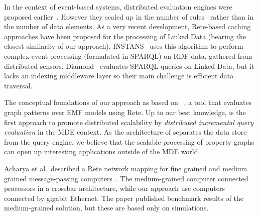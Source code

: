 In the context of event-based systems, distributed evaluation engines were proposed earlier~\cite{message-passing-rete}. However they scaled up in the number of rules~\cite{mapreduce-rete} rather than in the number of data elements. As a very recent development, Rete-based caching approaches have been proposed for the processing of Linked Data (bearing the closest similarity of our approach). INSTANS~\cite{INSTANS2012} uses this algorithm to perform complex event processing (formulated in SPARQL) on RDF data, gathered from distributed sensors. Diamond~\cite{miranker2012diamond} evaluates SPARQL queries on Linked Data, but it lacks an indexing middleware layer so their main challenge is efficient data traversal.

The conceptual foundations of our approach as based on \eiq{}~\cite{models10}, a tool that evaluates graph patterns over EMF models using Rete. Up to our best knowledge, \iqd{} is the first approach to promote distributed scalability by \emph{distributed incremental query evaluation} in the MDE context. As the architecture of \iqd{} separates the data store from the query engine, we believe that the scalable processing of property graphs can open up interesting applications outside of the MDE world.

Acharya et al.\ described a Rete network mapping for fine grained and medium grained message-passing computers~\cite{message-passing-rete}. The medium-grained computer connected processors in a crossbar architecture, while our approach use computers connected by gigabit Ethernet. The paper published benchmark results of the medium-grained solution, but these are based only on simulations.

